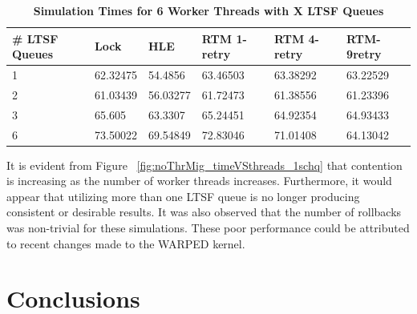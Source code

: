 \documentclass[a4paper]{article}
\begin{document}
\begin{table}[H]
    \centering
    \begin{tabular}{l|p{2cm}|p{2cm}|p{2cm}|p{2cm}|p{2cm}}
        \textbf{\# LTSF Queues}&Lock &HLE &RTM 1-retry &RTM 4-retry &RTM-9retry \\
        \hline
        \midrule
            1 &62.32475 &54.4856  &63.46503 &63.38292 &63.22529 \\  
            2 &61.03439 &56.03277 &61.72473 &61.38556 &61.23396 \\  
            3 &65.605   &63.3307  &65.24451 &64.92354 &64.93433 \\  
            6 &73.50022 &69.54849 &72.83046 &71.01408 &64.13042   
    \end{tabular}
    \caption{\textbf{Simulation Times for 6 Worker Threads with X LTSF Queues}}
    \label{tab:noThrMig_6threadsXschq}
\end{table}

It is evident from Figure ~\ref{fig:noThrMig_timeVSthreads_1schq} that
contention is increasing as the number of worker threads increases.
Furthermore, it would appear that utilizing more than one LTSF queue is no
longer producing consistent or desirable results. It was also observed that the
number of rollbacks was non-trivial for these simulations.  These poor
performance could be attributed to recent changes made to the WARPED kernel.\par

\newpage
\section{\textbf{Conclusions}}








\newpage


\end{document}
